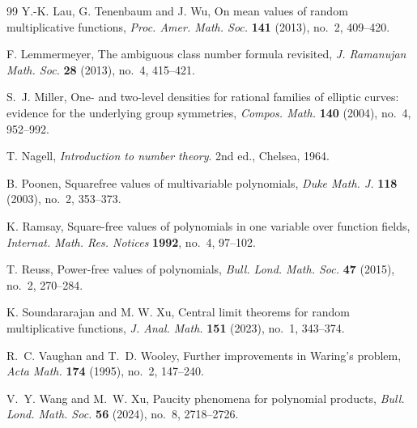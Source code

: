 \documentclass[reqno, 12pt]{amsart}
\theoremstyle{plain}
\theoremstyle{definition}
\theoremstyle{remark}
\begin{document}
\begin{thebibliography}{99}
Y.-K. Lau, G. Tenenbaum and J. Wu, On mean values of random multiplicative functions, {\em Proc. Amer. Math. Soc.} {\bf 141} (2013), no.~2, 409--420.

F. Lemmermeyer, The ambiguous class number formula revisited, {\em J. Ramanujan Math. Soc.} {\bf 28} (2013), no.~4, 415--421.

S.~J. Miller, One- and two-level densities for rational families of elliptic curves: evidence for the underlying group symmetries, {\em Compos. Math.} {\bf 140} (2004), no.~4, 952--992.

T. Nagell, {\it Introduction to number theory}. 2nd ed., Chelsea, 1964.

B. Poonen, Squarefree values of multivariable polynomials, {\em Duke Math. J.} {\bf 118} (2003), no.~2, 353--373.

K. Ramsay, Square-free values of polynomials in one variable over function fields, {\em Internat. Math. Res. Notices} {\bf 1992}, no.~4, 97--102.

T. Reuss, Power-free values of polynomials, {\em Bull. Lond. Math. Soc.} {\bf 47} (2015), no.~2, 270--284.

K. Soundararajan and M. W. Xu,
Central limit theorems for random multiplicative functions,
{\it J. Anal. Math.} {\bf  151} (2023), no.~1, 343--374.


R.~C. Vaughan and T.~D. Wooley, Further improvements in Waring's problem, {\em Acta Math.} {\bf 174} (1995), no.~2, 147--240.


V.~Y. Wang and M.~W. Xu, Paucity phenomena for polynomial products, {\em Bull. Lond. Math. Soc.} {\bf 56} (2024), no.~8, 2718--2726.

\end{thebibliography}
\end{document}
